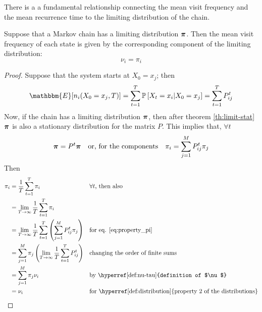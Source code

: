 \medskip
There is a a fundamental relationship connecting the mean visit frequency and the mean recurrence time to the limiting distribution of the chain.

\begin{theorem}
    Suppose that a Markov chain has a limiting distribution $\boldsymbol{\pi}$. Then the mean visit frequency of each state is given by the corresponding component of the limiting distribution:
    \begin{equation}
        \nu_i = \pi_i
    \end{equation}
\end{theorem}
\begin{proof}
   Suppose that the system starts at $X_0 = x_j$; then 
    \begin{equation} \label{eq:expected_value}
        \mathbbm{E} [ n_i (X_0 = x_j, T)] = \sum_{t = 1}^T \prob{X_t = x_i | X_0 = x_j} = \sum_{t = 1}^T P_{ij}^t
    \end{equation} 
    Now, if the chain has a limiting distribution $\boldsymbol{\pi}$, then after theorem \ref{th:limit-stat} $\boldsymbol{\pi}$ is also a stationary distribution for the matrix $P$. This implies that, $\forall t$
    \begin{equation} \label{eq:property_pi}
        \boldsymbol{\pi} = P^t \boldsymbol{\pi}  \quad \text{or, for the components}\quad \pi_i = \sum_{j = 1}^M P_{ij}^t \pi_{j}
    \end{equation}
    Then
        \begin{align}
            \pi_i 
                &  = \frac{1}{T} \sum_{t = 1}^T \pi_i && \forall t\text{, then also}\\
                &  = \lim_{T \rightarrow \infty} \frac{1}{T} \sum_{t = 1}^T \pi_i \\
                & = \lim_{T \rightarrow \infty}  \frac{1}{T} \sum_{t = 1}^T \left(\sum_{j = 1}^M P_{ij}^t \pi_{j}\right) &&  \text{for eq. \ref{eq:property_pi}}\\
                & = \sum_{j = 1}^M \pi_j \left(\lim_{T \rightarrow \infty}  \frac{1}{T}  \sum_{t = 1}^T P_{ij}^t \right) && \text{changing the order of finite sums} \\
                & = \sum_{j = 1}^M \pi_j \nu_i && \text{by \hyperref[def:nu-tau]{definition of $\nu$}} \\
                & = \nu_i && \text{for \hyperref[def:distribution] {property 2  of the distributions}}
        \end{align}
\end{proof}